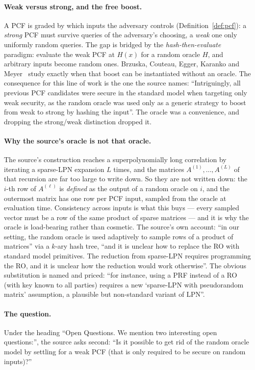 \documentclass{aicr-conjecture}
\begin{document}
\paragraph{Weak versus strong, and the free boost.}
A PCF is graded by which inputs the adversary controls
(Definition~\ref{def:pcf}): a \emph{strong} PCF must survive queries of
the adversary's choosing, a \emph{weak} one only uniformly random
queries. The gap is bridged by the \emph{hash-then-evaluate} paradigm:
evaluate the weak PCF at $H(x)$ for a random oracle $H$, and arbitrary
inputs become random ones. Brzuska, Couteau, Egger, Karanko and
Meyer~\cite{BCEKM24} study exactly when that boost can be instantiated
without an oracle. The consequence for this line of work is the one the
source names: ``Intriguingly, all previous PCF candidates were secure in
the standard model when targeting only weak security, as the random
oracle was used only as a generic strategy to boost from weak to strong
by hashing the input''. The oracle was a convenience, and dropping the
strong/weak distinction dropped it.

\paragraph{Why the source's oracle is not that oracle.}
The source's construction reaches a superpolynomially long correlation
by iterating a sparse-LPN expansion $L$ times, and the matrices
$A^{(1)}, \dots, A^{(L)}$ of that recursion are far too large to write
down. So they are not written down: the $i$-th row of $A^{(\ell)}$ is
\emph{defined} as the output of a random oracle on $i$, and the
outermost matrix has one row per PCF input, sampled from the oracle at
evaluation time. Consistency across inputs is what this buys --- every
sampled vector must be a row of the same product of sparse matrices ---
and it is why the oracle is load-bearing rather than cosmetic. The
source's own account: ``in our setting, the random oracle is used
adaptively to sample rows of a product of matrices'' via a $k$-ary hash
tree, ``and it is unclear how to replace the RO with standard model
primitives. The reduction from sparse-LPN requires programming the RO,
and it is unclear how the reduction would work otherwise''. The obvious
substitution is named and priced: ``for instance, using a PRF instead of
a RO (with key known to all parties) requires a new `sparse-LPN with
pseudorandom matrix' assumption, a plausible but non-standard variant
of LPN''.

\paragraph{The question.}
Under the heading ``Open Questions. We mention two interesting open
questions:'', the source asks second: ``Is it possible to get rid of the
random oracle model by settling for a weak PCF (that is only required to
be secure on random inputs)?''
\end{document}
